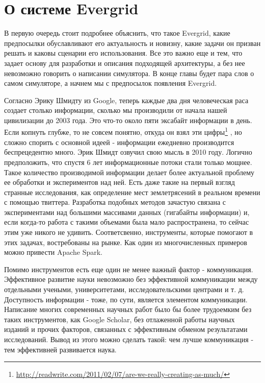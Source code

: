 \chapter{О системе Evergrid}

В первую очередь стоит подробнее объяснить, что такое Evergrid, какие предпосылки обуславливают его актуальность и новизну, какие задачи он призван решать и каковы сценарии его использования. Все это важно еще и тем, что задает основу для разработки и описания подходящей архитектуры, а без нее невозможно говорить о написании симулятора. В конце главы будет пара слов о самом симуляторе, а начнем мы с предпосылок появления Evergrid.

Согласно Эрику Шмидту из Google, теперь каждые два дня человеческая раса создает столько информации, сколько мы производили от начала нашей цивилизации до 2003 года. Это что-то около пяти эксабайт информации в день. Если копнуть глубже, то не совсем понятно, откуда он взял эти цифры\footnote{\url{http://readwrite.com/2011/02/07/are-we-really-creating-as-much/}} , но сложно спорить с основной идеей - информации ежедневно производится беспрецедентно много. Эрик Шмидт озвучил свою мысль в 2010 году. Логично предположить, что спустя 6 лет информационные потоки стали только мощнее. Такое количество производимой информации делает более актуальной проблему ее обработки и экспериментов над ней. Есть даже такие на первый взгляд странные исследования, как определение мест землетрясений в реальном времени с помощью твиттера\cite{Sakaki:2010:EST:1772690.1772777}. Разработка подобных методов зачастую связана с экспериментами над большими массивами данных (гигабайты информации) и, если когда-то работа с такими объемами была мало распространена, то сейчас этим уже никого не удивить. Соответсвенно, инструменты, которые помогают в этих задачах, востребованы на рынке. Как один из многочисленных примеров можно привести Apache Spark.

Помимо инструментов есть еще один не менее важный фактор - коммуникация. Эффективное развитие науки невозможно без эффективной коммуникации между отдельными учеными, университетами, исследовательскими центрами и т. д. Доступность информации - тоже, по сути, является элементом коммуникации. Написание многих современных научных работ было бы более трудоемким без таких инструментов, как Google Scholar, без отлаженной работы научных изданий и прочих факторов, связанных с эффективным обменом результатами исследований. Вывод из этого можно сделать такой: чем лучше коммуникация - тем эффективней развивается наука.

